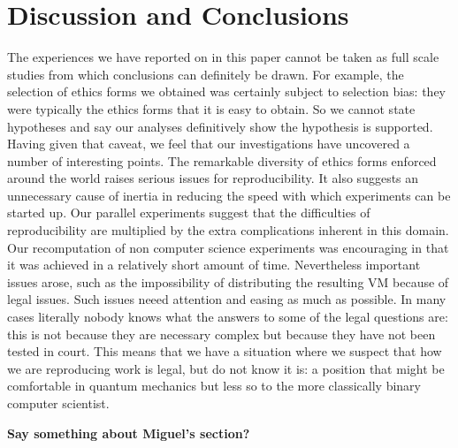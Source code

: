 \section{Discussion and Conclusions}
\label{s:discussion}

The experiences we have reported on in this paper cannot be taken as full scale studies from which conclusions can definitely be drawn.  For example, the 
selection of ethics forms we obtained was certainly subject to selection bias: they were typically the ethics forms that it is easy to obtain.  So we cannot state hypotheses and say our analyses definitively show the hypothesis is supported.   Having given that caveat, we feel that our investigations have uncovered a number of interesting points.  The remarkable diversity of ethics forms enforced around the world raises serious issues for reproducibility.  It also suggests an unnecessary cause of inertia in reducing the speed with which experiments can be started up.  Our parallel experiments suggest that the difficulties of reproducibility are 
multiplied by the extra complications inherent in this domain.  Our
recomputation of non computer science experiments was encouraging in
that it was achieved in a relatively short amount of time.
Nevertheless important issues arose, such as the impossibility of
distributing the resulting VM because of legal issues. 
Such issues neeed attention and easing as much as possible.  In many cases literally nobody knows what the answers to some of the legal questions are: this is not because they are necessary complex but because they have not been tested in court.  This means that we have a situation where we suspect that how we are reproducing work is legal, but do not know it is: a position that might be comfortable in quantum mechanics but less so to the more classically binary computer scientist. 

\textbf{Say something about Miguel's section?}


